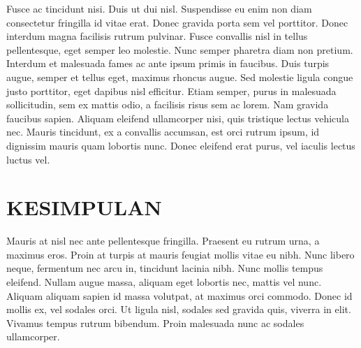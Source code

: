 \documentclass[a4paper,12pt]{article}
\begin{document}
Fusce ac tincidunt nisi. Duis ut dui nisl. Suspendisse eu enim non diam consectetur fringilla id vitae erat. Donec gravida porta sem vel porttitor. Donec interdum magna facilisis rutrum pulvinar. Fusce convallis nisl in tellus pellentesque, eget semper leo molestie. Nunc semper pharetra diam non pretium. Interdum et malesuada fames ac ante ipsum primis in faucibus. Duis turpis augue, semper et tellus eget, maximus rhoncus augue. Sed molestie ligula congue justo porttitor, eget dapibus nisl efficitur. Etiam semper, purus in malesuada sollicitudin, sem ex mattis odio, a facilisis risus sem ac lorem. Nam gravida faucibus sapien. Aliquam eleifend ullamcorper nisi, quis tristique lectus vehicula nec. Mauris tincidunt, ex a convallis accumsan, est orci rutrum ipsum, id dignissim mauris quam lobortis nunc. Donec eleifend erat purus, vel iaculis lectus luctus vel.
\pagebreak
\section{\textbf{KESIMPULAN}}
Mauris at nisl nec ante pellentesque fringilla. Praesent eu rutrum urna, a maximus eros. Proin at turpis at mauris feugiat mollis vitae eu nibh. Nunc libero neque, fermentum nec arcu in, tincidunt lacinia nibh. Nunc mollis tempus eleifend. Nullam augue massa, aliquam eget lobortis nec, mattis vel nunc. Aliquam aliquam sapien id massa volutpat, at maximus orci commodo. Donec id mollis ex, vel sodales orci. Ut ligula nisl, sodales sed gravida quis, viverra in elit. Vivamus tempus rutrum bibendum. Proin malesuada nunc ac sodales ullamcorper.
\end{document}
